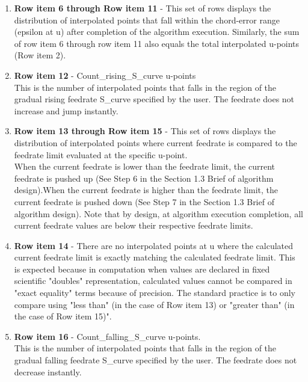 \begin{enumerate}
	\item \textbf{Row item 6 through Row item 11} - This set of rows displays the distribution of interpolated points that fall within the chord-error range (epsilon at u) after completion of the algorithm execution.
	Similarly, the sum of row item 6 through row item 11 also equals the total interpolated u-points (Row item 2).\\
	
	\item \textbf{Row item 12} - Count\_rising\_S\_curve u-points\\ 
	This is the number of interpolated points that falls in the region of the gradual rising feedrate S\_curve specified by the user. The feedrate does not increase and jump instantly.\\
	
	\item \textbf{Row item 13 through Row item 15} - This set of rows displays the distribution of interpolated points where current feedrate is compared to the feedrate limit evaluated at the specific u-point. \\ 
	When the current feedrate is lower than the feedrate limit, the current feedrate is pushed up (See Step 6 in the Section 1.3 Brief of algorithm design).When the current feedrate is higher than the feedrate limit, the current feedrate is pushed down (See Step 7 in the Section 1.3 Brief of algorithm design). Note that by design, at algorithm execution completion, all current feedrate values are below their respective feedrate limits.\\ 
	
	\item \textbf{Row item 14} - There are no interpolated points at u where the calculated current feedrate limit is exactly matching the calculated feedrate limit. This is expected because in computation when values are declared in fixed scientific "doubles" representation, calculated values cannot be compared in "exact equality" terms because of precision. The standard practice is to only compare using "less than" (in the case of Row item 13) or "greater than" (in the case of Row item 15)".\\
	
	\item \textbf{Row item 16} - Count\_falling\_S\_curve u-points.\\ 
	This is the number of interpolated points that falls in the region of the gradual falling feedrate S\_curve specified by the user. The feedrate does not decrease instantly.\\
	

\end{enumerate}
